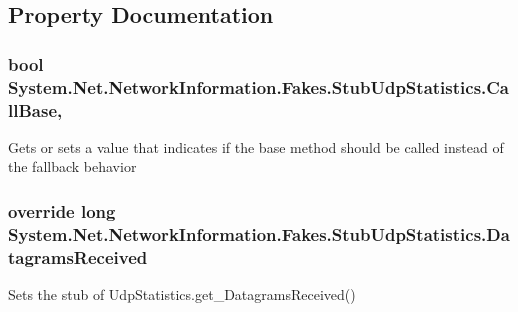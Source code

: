 \subsection{Property Documentation}
\hypertarget{class_system_1_1_net_1_1_network_information_1_1_fakes_1_1_stub_udp_statistics_a530d62e8fa5c9b0050570d94e007d89b}{
\subsubsection[{Call\-Base}]{\setlength{\rightskip}{0pt plus 5cm}bool System.\-Net.\-Network\-Information.\-Fakes.\-Stub\-Udp\-Statistics.\-Call\-Base\hspace{0.3cm}{\ttfamily [get]}, {\ttfamily [set]}}}\label{class_system_1_1_net_1_1_network_information_1_1_fakes_1_1_stub_udp_statistics_a530d62e8fa5c9b0050570d94e007d89b}


Gets or sets a value that indicates if the base method should be called instead of the fallback behavior

\hypertarget{class_system_1_1_net_1_1_network_information_1_1_fakes_1_1_stub_udp_statistics_a01f11831573c1563ca62a7e464b5cea7}{
\subsubsection[{Datagrams\-Received}]{\setlength{\rightskip}{0pt plus 5cm}override long System.\-Net.\-Network\-Information.\-Fakes.\-Stub\-Udp\-Statistics.\-Datagrams\-Received\hspace{0.3cm}{\ttfamily [get]}}}\label{class_system_1_1_net_1_1_network_information_1_1_fakes_1_1_stub_udp_statistics_a01f11831573c1563ca62a7e464b5cea7}


Sets the stub of Udp\-Statistics.\-get\-\_\-\-Datagrams\-Received()

